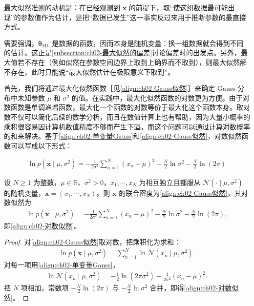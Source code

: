 \documentclass[../../main.tex]{subfiles}
\begin{document}
\begin{remark}
最大似然准则的动机是：在已经观测到 $\mathbf{x}$ 的前提下，取“使这组数据最可能出现”的参数值作为估计，是把“数据已发生”这一事实反过来用于推断参数的最直接方式。

需要强调，$\boldsymbol{\theta}_{\mathrm{ML}}$ 是数据的函数，因而本身是随机变量：换一组数据就会得到不同的估计。这正是\cref{subsection:ch02-最大似然的偏差}讨论偏差时的出发点。另外，最大值若不存在（例如似然在参数空间边界上取到上确界而不取到），则最大似然解不存在，此时只能说“最大似然估计在极限意义下取到”。
\end{remark}

首先，我们将通过最大化似然函数［见\eqref{align:ch02-Gauss似然}］来确定 Gauss 分布中未知参数 $\mu$ 和 $\sigma^{2}$ 的值。在实践中，最大化似然函数的对数更为方便。由于对数函数是单调递增函数，最大化一个函数的对数等价于最大化这个函数本身。取对数不仅可以简化后续的数学分析，而且在数值计算上也有帮助，因为大量小概率的乘积很容易因计算机数值精度不够而产生下溢，而这个问题可以通过计算对数概率的和来解决。基于\eqref{align:ch02-单变量Gauss}和\eqref{align:ch02-Gauss似然}，对数似然函数可以写成以下形式：

\begin{align}
  \ln p(\mathbf{x}\mid\mu,\sigma^{2}) = -\frac{1}{2\sigma^{2}}\sum_{n=1}^{N}(x_n-\mu)^{2} - \frac{N}{2}\ln\sigma^{2} - \frac{N}{2}\ln(2\pi)
  \label{align:ch02-对数似然}
\end{align}

\begin{proposition}\label{proposition:ch02-对数似然}
设 $N\geqslant1$ 为整数，$\mu\in\mathbb{R}$、$\sigma^{2}>0$，$x_1,\cdots,x_N$ 为相互独立且都服从 $\mathcal{N}(\cdot\mid\mu,\sigma^{2})$ 的随机变量，$\mathbf{x}=(x_1,\cdots,x_N)$。则 $\mathbf{x}$ 的联合密度为\eqref{align:ch02-Gauss似然}，其对数似然为
\begin{align*}
  \ln p(\mathbf{x}\mid\mu,\sigma^{2})=-\frac{1}{2\sigma^{2}}\sum_{n=1}^{N}(x_n-\mu)^{2}-\frac{N}{2}\ln\sigma^{2}-\frac{N}{2}\ln(2\pi),
\end{align*}
即\eqref{align:ch02-对数似然}。
\end{proposition}

\begin{proof}
对\eqref{align:ch02-Gauss似然}取对数，把乘积化为求和：
\begin{align*}
 \ln p(\mathbf{x}\mid\mu,\sigma^{2}) = \sum_{n=1}^{N}\ln\mathcal{N}(x_n\mid\mu,\sigma^{2}) .
\end{align*}
对每一项用\eqref{align:ch02-单变量Gauss}，
\begin{align*}
 \ln\mathcal{N}(x_n\mid\mu,\sigma^{2}) = -\frac{1}{2}\ln(2\pi\sigma^{2}) - \frac{1}{2\sigma^{2}}(x_n-\mu)^{2} .
\end{align*}
把 $N$ 项相加，常数项 $-\frac{N}{2}\ln(2\pi)$ 与 $-\frac{N}{2}\ln\sigma^{2}$ 合并，即得\eqref{align:ch02-对数似然}。
\end{proof}
\end{document}
